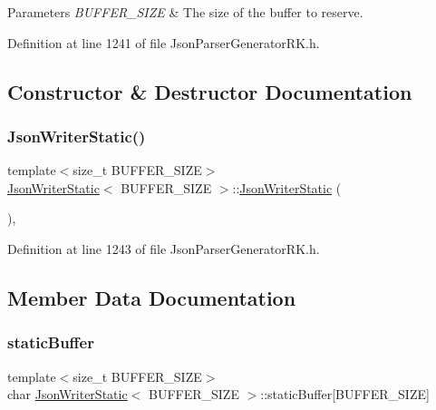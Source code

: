 \begin{DoxyParams}{Parameters}
{\em B\+U\+F\+F\+E\+R\+\_\+\+S\+I\+ZE} & The size of the buffer to reserve. \\
\hline
\end{DoxyParams}


Definition at line 1241 of file Json\+Parser\+Generator\+R\+K.\+h.



\subsection{Constructor \& Destructor Documentation}
\mbox{\label{class_json_writer_static_aef07dcd39c03c2f34566c84a3408f922}} 
\subsubsection{\texorpdfstring{Json\+Writer\+Static()}{JsonWriterStatic()}}
{\footnotesize\ttfamily template$<$size\+\_\+t B\+U\+F\+F\+E\+R\+\_\+\+S\+I\+ZE$>$ \\
\hyperlink{class_json_writer_static}{Json\+Writer\+Static}$<$ B\+U\+F\+F\+E\+R\+\_\+\+S\+I\+ZE $>$\+::\hyperlink{class_json_writer_static}{Json\+Writer\+Static} (\begin{DoxyParamCaption}{ }\end{DoxyParamCaption})\hspace{0.3cm}{\ttfamily [inline]}, {\ttfamily [explicit]}}



Definition at line 1243 of file Json\+Parser\+Generator\+R\+K.\+h.



\subsection{Member Data Documentation}
\mbox{\label{class_json_writer_static_af733d279f0980f674ce08c15f71cc358}} 
\subsubsection{\texorpdfstring{static\+Buffer}{staticBuffer}}
{\footnotesize\ttfamily template$<$size\+\_\+t B\+U\+F\+F\+E\+R\+\_\+\+S\+I\+ZE$>$ \\
char \hyperlink{class_json_writer_static}{Json\+Writer\+Static}$<$ B\+U\+F\+F\+E\+R\+\_\+\+S\+I\+ZE $>$\+::static\+Buffer\mbox{[}B\+U\+F\+F\+E\+R\+\_\+\+S\+I\+ZE\mbox{]}\hspace{0.3cm}{\ttfamily [private]}}



